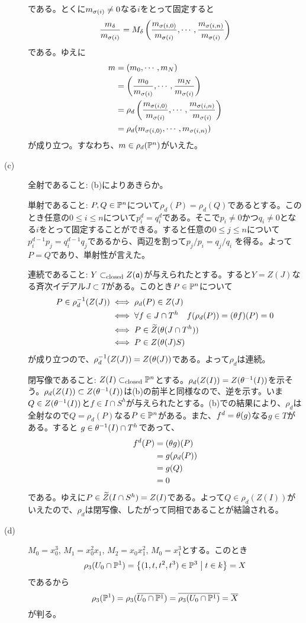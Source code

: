 \begin{description}
\[  \]
  である。とくに$m_{\grs(i)} \neq 0$なる$i$をとって固定すると
  \[
\f{m_{\grd}}{m_{\grs(i)}} = M_{\grd}\left( \f{m_{\grs(i,0)}}{m_{\grs(i)}}, \cdots , \f{ m_{ \grs(i,n) }}{  m_{\grs(i)}  }   \right)
  \]
  である。ゆえに
  \begin{align*}
    m &= (m_0, \cdots , m_N) \\
    &= \left( \f{m_0}{m_{\grs(i)}} , \cdots , \f{m_N}{m_{\grs(i)}} \right) \\
    &= \rho_d \left( \f{m_{\grs(i,0)}}{m_{\grs(i)}}, \cdots , \f{ m_{ \grs(i,n) }}{ m_{\grs(i)} } \right) \\
    &= \rho_d ( m_{\grs(i,0) }, \cdots ,  m_{\grs(i,n)} )
  \end{align*}
  が成り立つ。すなわち、$m \in \rho_d(\P^n)$がいえた。
 \item[(c)] 全射であること: (b)によりあきらか。

 単射であること: $P,Q \in \P^n$について$\rho_d(P)=\rho_d(Q)$であるとする。このとき任意の$0 \leq i \leq n$について$p_i^d = q_i^d$である。そこで$p_i \neq 0$かつ$q_i \neq 0$となる$i$をとって固定することができる。すると任意の$0 \leq j \leq n$について$p_i^{d-1} p_j= q_i^{d-1} q_j$であるから、両辺を割って$p_j/p_i=q_j/q_i$
 を得る。よって$P=Q$であり、単射性が言えた。

 連続であること: $Y \clsub Z(\fraka)$が与えられたとする。すると$Y = Z(J)$なる斉次イデアル$J \subset T$がある。このとき$P \in \P^n$について
 \begin{align*}
   P \in \rho_d^{-1}(Z(J)) &\iff \rho_d(P) \in Z(J) \\
   &\iff \forall f \in J \cap T^h \quad f(\rho_d(P))=(\grt f)(P)= 0 \\
   &\iff P \in {\wt Z}(\grt (J \cap T^h)) \\
   &\iff P \in Z(\grt (J) S)
 \end{align*}
 が成り立つので、$\rho_d^{-1}(Z(J)) = Z(\grt (J))$である。よって$\rho_d$は連続。

 閉写像であること: $Z(I) \clsub \P^n$とする。$\rho_d(Z(I)) = Z(\grt^{-1}(I))$を示そう。$\rho_d(Z(I)) \subset  Z(\grt^{-1}(I))$は(b)の前半と同様なので、逆を示す。いま$Q \in Z(\grt^{-1}(I))$と$f \in I \cap S^h$が与えられたとする。(b)での結果により、$\rho_d$は全射なので$Q = \rho_d(P)$なる$P \in \P^n$がある。また、$f^d = \grt(g)$なる$g \in T$がある。すると
 $g \in \grt^{-1}(I) \cap T^h$であって、
 \begin{align*}
   f^d(P) &= (\grt g)(P) \\
   &= g(\rho_d(P)) \\
   &= g(Q) \\
   &= 0
 \end{align*}
 である。ゆえに$P \in {\wt Z}(I \cap S^h) =Z(I)$である。よって$Q \in \rho_d(Z(I))$がいえたので、$\rho_d$は閉写像、したがって同相であることが結論される。
 \item[(d)] $M_0 = x_0^3$, $M_1 = x_0^2x_1$, $M_2 = x_0x_1^2$, $M_0 = x_1^3$とする。このとき
 \[
 \rho_3(U_0 \cap \P^1) = \setmid{(1,t,t^2,t^3) \in \P^3}{t \in k} = X
 \]
 であるから
 \[
 \rho_3(\P^1) =  \rho_3(\ol{U_0 \cap \P^1}) = \ol{\rho_3(U_0 \cap \P^1)} = \ol{X}
 \]
 が判る。
 \end{description}



